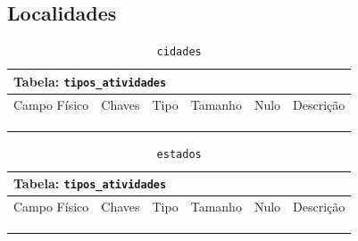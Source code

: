 \documentclass[12pt,a4paper]{article}
\begin{document}
\subsection{Localidades}


\begin{center}
\begin{table}[h!]
	\caption{\texttt{cidades}}
	\label{tabela:cidades}
	\begin{tabular}{|p{2.5cm}|p{1cm}|p{1.25cm}|p{1.75cm}|p{1.25cm}|p{5cm}|}\hline	
		\multicolumn{6}{|p{16cm}|}{\cellcolor{cinzaClaro}  \centering Tabela: \texttt{tipos\_atividades}} \\ \hline %
		{\small Campo Físico}   & {\small Chaves} & {\small Tipo} & {\small Tamanho} & {\small Nulo} & {\small Descrição}\\\hline %
		
		{\tiny } & {\tiny } & {\tiny } & {\tiny } & {\tiny } &{\tiny }\\\hline
		{\tiny } & {\tiny } & {\tiny } & {\tiny } & {\tiny } &{\tiny }\\\hline
		{\tiny } & {\tiny } & {\tiny } & {\tiny } & {\tiny } &{\tiny }\\\hline
		
			
	\end{tabular}
\end{table}	
\end{center}

\begin{center}
\begin{table}[h!]
	\caption{\texttt{estados}}
	\label{tabela:estados}
	\begin{tabular}{|p{2.5cm}|p{1cm}|p{1.25cm}|p{1.75cm}|p{1.25cm}|p{5cm}|}\hline	
		\multicolumn{6}{|p{16cm}|}{\cellcolor{cinzaClaro}  \centering Tabela: \texttt{tipos\_atividades}} \\ \hline %
		{\small Campo Físico}   & {\small Chaves} & {\small Tipo} & {\small Tamanho} & {\small Nulo} & {\small Descrição}\\\hline %
		
		{\tiny } & {\tiny } & {\tiny } & {\tiny } & {\tiny } &{\tiny }\\\hline
		{\tiny } & {\tiny } & {\tiny } & {\tiny } & {\tiny } &{\tiny }\\\hline
		{\tiny } & {\tiny } & {\tiny } & {\tiny } & {\tiny } &{\tiny }\\\hline
			
	\end{tabular}
\end{table}	
\end{center}
\end{document}
